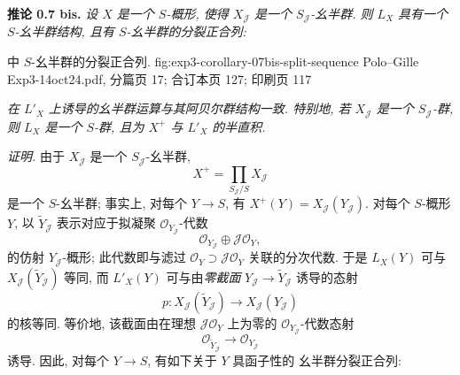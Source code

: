 
\setcounter{footnote}{26}

\medskip
\noindent{}\textbf{推论 0.7 bis.}
\textit{设 \(X\) 是一个 \(S\)-概形, 使得 \(X_{\mathscr J}\) 是一个
\(S_{\mathscr J}\)-幺半群. 则 \(L_X\) 具有一个
\(S\)-幺半群结构, 且有 \(S\)-幺半群的分裂正合列:}

  { 中 \(S\)-幺半群的分裂正合列.}
  {fig:exp3-corollary-07bis-split-sequence}
  {Polo--Gille Exp3-14oct24.pdf, 分篇页 17; 合订本页 127; 印刷页 117}

\textit{在 \(L'_X\) 上诱导的幺半群运算与其阿贝尔群结构一致.
特别地, 若 \(X_{\mathscr J}\) 是一个 \(S_{\mathscr J}\)-群,
则 \(L_X\) 是一个 \(S\)-群, 且为 \(X^+\) 与 \(L'_X\) 的半直积.}

\noindent\textit{证明.}
由于 \(X_{\mathscr J}\) 是一个 \(S_{\mathscr J}\)-幺半群,
\[
 X^+=\prod_{S_{\mathscr J}/S}X_{\mathscr J}
\]
是一个 \(S\)-幺半群; 事实上, 对每个 \(Y\to S\), 有
\(X^+(Y)=X_{\mathscr J}(Y_{\mathscr J})\).
对每个 \(S\)-概形 \(Y\), 以 \(\widetilde Y_{\mathscr J}\)
表示对应于拟凝聚 \(\mathscr O_{Y_{\mathscr J}}\)-代数
\[
 \mathscr O_{Y_{\mathscr J}}\oplus\mathscr J\mathscr O_Y,
\]
的仿射 \(Y_{\mathscr J}\)-概形; 此代数即与滤过
\(\mathscr O_Y\supset\mathscr J\mathscr O_Y\) 关联的分次代数.
于是 \(L_X(Y)\) 可与 \(X_{\mathscr J}(\widetilde Y_{\mathscr J})\)
等同, 而 \(L'_X(Y)\) 可与由\emph{零截面}
\(Y_{\mathscr J}\to\widetilde Y_{\mathscr J}\) 诱导的态射
\[
 p:X_{\mathscr J}(\widetilde Y_{\mathscr J})
   \longrightarrow X_{\mathscr J}(Y_{\mathscr J})
\]
的核等同. 等价地, 该截面由在理想 \(\mathscr J\mathscr O_Y\)
上为零的 \(\mathscr O_{Y_{\mathscr J}}\)-代数态射
\[
 \mathscr O_{\widetilde Y_{\mathscr J}}
   \longrightarrow\mathscr O_{Y_{\mathscr J}}
\]
诱导. 因此, 对每个 \(Y\to S\), 有如下关于 \(Y\) 具函子性的
幺半群分裂正合列:

